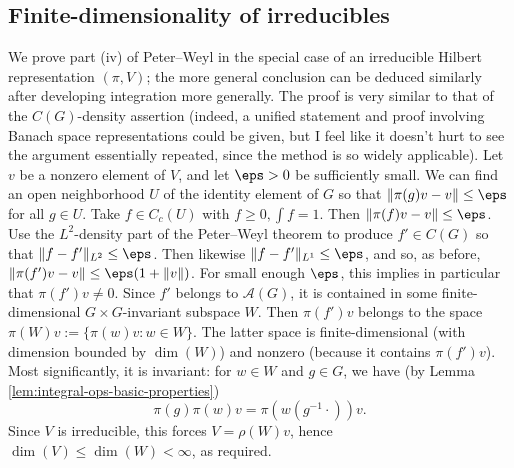 \documentclass[reqno]{amsart} 
\begin{document}
\subsection{Finite-dimensionality of irreducibles}\label{sec:finite-dimens-irred}
We prove part (iv) of Peter--Weyl in the special case of an irreducible Hilbert representation $(\pi,V)$; the more general conclusion can be deduced similarly after developing integration more generally.  The proof is very similar to that of the $C(G)$-density assertion (indeed, a unified statement and proof involving Banach space representations could be given, but I feel like it doesn't hurt to see the argument essentially repeated, since the method is so widely applicable).  Let $v$ be a nonzero element of $V$, and let $\eps > 0$ be sufficiently small.  We can find an open neighborhood $U$ of the identity element of $G$ so that $\|\pi(g) v - v\| \leq \eps$ for all $g \in U$.  Take $f \in C_c(U)$ with $f \geq 0, \int f = 1$.  Then $\|\pi(f) v - v\| \leq \eps$.  Use the $L^2$-density part of the Peter--Weyl theorem to produce $f' \in C(G)$ so that $\|f - f'\|_{L^2} \leq \eps$.  Then likewise $\|f - f'\|_{L^1} \leq \eps$, and so, as before, $\|\pi(f') v - v \| \leq \eps (1 + \|v\|)$.  For small enough $\eps$, this implies in particular that $\pi(f') v \neq 0$.  Since $f'$ belongs to $\mathcal{A}(G)$, it is contained in some finite-dimensional $G \times G$-invariant subspace $W$.  Then $\pi (f') v$ belongs to the space $\pi(W) v := \{\pi(w) v : w \in W\}$.  The latter space is finite-dimensional (with dimension bounded by $\dim(W)$) and nonzero (because it contains $\pi (f') v$).  Most significantly, it is invariant: for $w \in W$ and $g \in G$, we have (by Lemma \ref{lem:integral-ops-basic-properties})
\begin{equation*}
  \pi(g) \pi(w) v = \pi(w(g^{-1} \cdot )) v.
\end{equation*}
Since $V$ is irreducible, this forces $V = \rho(W) v$, hence $\dim(V) \leq \dim(W) < \infty$, as required.
\end{document}
